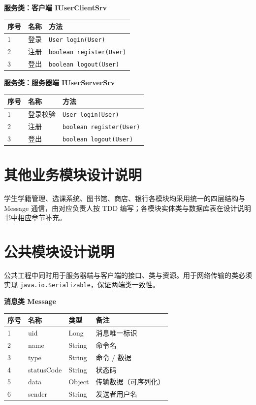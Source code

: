 \documentclass[12pt,a4paper]{ctexart}
\begin{document}
\textbf{服务类：客户端 IUserClientSrv}
\begin{center}
\begin{tabular}{l l l}
\toprule
序号 & 名称 & 方法 \\
\midrule
1 & 登录 & \texttt{User login(User)} \\
2 & 注册 & \texttt{boolean register(User)} \\
3 & 登出 & \texttt{boolean logout(User)} \\
\bottomrule
\end{tabular}
\end{center}

\textbf{服务类：服务器端 IUserServerSrv}
\begin{center}
\begin{tabular}{l l l}
\toprule
序号 & 名称 & 方法 \\
\midrule
1 & 登录校验 & \texttt{User login(User)} \\
2 & 注册 & \texttt{boolean register(User)} \\
3 & 登出 & \texttt{boolean logout(User)} \\
\bottomrule
\end{tabular}
\end{center}

\section{其他业务模块设计说明}
学生学籍管理、选课系统、图书馆、商店、银行各模块均采用统一的四层结构与 Message 通信，由对应负责人按 TDD 编写；各模块实体类与数据库表在设计说明书中相应章节补充。

\section{公共模块设计说明}
公共工程中同时用于服务器端与客户端的接口、类与资源。用于网络传输的类必须实现 \texttt{java.io.Serializable}，保证两端类一致性。

\textbf{消息类 Message}
\begin{center}
\begin{tabular}{l l l l}
\toprule
序号 & 名称 & 类型 & 备注 \\
\midrule
1 & uid & Long & 消息唯一标识 \\
2 & name & String & 命令名 \\
3 & type & String & 命令 / 数据 \\
4 & statusCode & String & 状态码 \\
5 & data & Object & 传输数据（可序列化） \\
6 & sender & String & 发送者用户名 \\
\bottomrule
\end{tabular}
\end{center}
\end{document}
